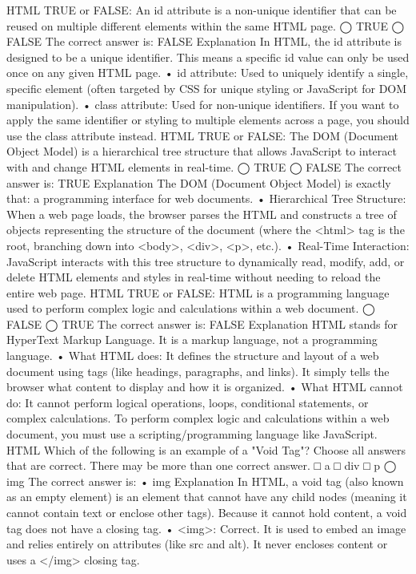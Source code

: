 HTML
TRUE or FALSE: An id attribute is a non-unique identifier that can be reused on multiple different elements within the same HTML page.
◯ TRUE
◯ FALSE
The correct answer is:
FALSE
Explanation
In HTML, the id attribute is designed to be a unique identifier. This means a specific id value can only be used once on any given HTML page.
•	id attribute: Used to uniquely identify a single, specific element (often targeted by CSS for unique styling or JavaScript for DOM manipulation).
•	class attribute: Used for non-unique identifiers. If you want to apply the same identifier or styling to multiple elements across a page, you should use the class attribute instead.
HTML
TRUE or FALSE: The DOM (Document Object Model) is a hierarchical tree structure that allows JavaScript to interact with and change HTML elements in real-time.
◯ TRUE
◯ FALSE
The correct answer is:
TRUE
Explanation
The DOM (Document Object Model) is exactly that: a programming interface for web documents.
•	Hierarchical Tree Structure: When a web page loads, the browser parses the HTML and constructs a tree of objects representing the structure of the document (where the <html> tag is the root, branching down into <body>, <div>, <p>, etc.).
•	Real-Time Interaction: JavaScript interacts with this tree structure to dynamically read, modify, add, or delete HTML elements and styles in real-time without needing to reload the entire web page.
HTML
TRUE or FALSE: HTML is a programming language used to perform complex logic and calculations within a web document.
◯ FALSE
◯ TRUE
The correct answer is:
FALSE
Explanation
HTML stands for HyperText Markup Language. It is a markup language, not a programming language.
•	What HTML does: It defines the structure and layout of a web document using tags (like headings, paragraphs, and links). It simply tells the browser what content to display and how it is organized.
•	What HTML cannot do: It cannot perform logical operations, loops, conditional statements, or complex calculations.
To perform complex logic and calculations within a web document, you must use a scripting/programming language like JavaScript.
HTML
Which of the following is an example of a "Void Tag"?
Choose all answers that are correct. There may be more than one correct answer.
□ a
□ div
□ p
◯ img
The correct answer is:
•	img
Explanation
In HTML, a void tag (also known as an empty element) is an element that cannot have any child nodes (meaning it cannot contain text or enclose other tags). Because it cannot hold content, a void tag does not have a closing tag.
•	<img>: Correct. It is used to embed an image and relies entirely on attributes (like src and alt). It never encloses content or uses a </img> closing tag.
